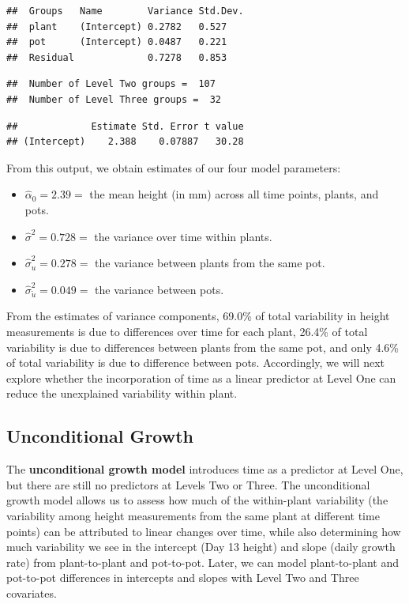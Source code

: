 \documentclass[
]{krantz}
\providecommand{\tightlist}{%
  \setlength{\itemsep}{0pt}\setlength{\parskip}{0pt}}
\begin{document}
\begin{verbatim}
##  Groups   Name        Variance Std.Dev.
##  plant    (Intercept) 0.2782   0.527   
##  pot      (Intercept) 0.0487   0.221   
##  Residual             0.7278   0.853
\end{verbatim}

\begin{verbatim}
##  Number of Level Two groups =  107 
##  Number of Level Three groups =  32
\end{verbatim}

\begin{verbatim}
##             Estimate Std. Error t value
## (Intercept)    2.388    0.07887   30.28
\end{verbatim}

From this output, we obtain estimates of our four model parameters:

\begin{itemize}
\tightlist
\item
  \(\hat{\alpha}_{0}=2.39=\) the mean height (in mm) across all time points, plants, and pots.
\item
  \(\hat{\sigma}^2=0.728=\) the variance over time within plants.
\item
  \(\hat{\sigma}_{u}^{2}=0.278=\) the variance between plants from the same pot.
\item
  \(\hat{\sigma}_{\tilde{u}}^{2}=0.049=\) the variance between pots.
\end{itemize}

From the estimates of variance components, 69.0\% of total variability in height measurements is due to differences over time for each plant, 26.4\% of total variability is due to differences between plants from the same pot, and only 4.6\% of total variability is due to difference between pots. Accordingly, we will next explore whether the incorporation of time as a linear predictor at Level One can reduce the unexplained variability within plant.

\hypertarget{unconditional-growth}{%
\subsection{Unconditional Growth}\label{unconditional-growth}}

The \textbf{unconditional growth model}  introduces time as a predictor at Level One, but there are still no predictors at Levels Two or Three. The unconditional growth model allows us to assess how much of the within-plant variability (the variability among height measurements from the same plant at different time points) can be attributed to linear changes over time, while also determining how much variability we see in the intercept (Day 13 height) and slope (daily growth rate) from plant-to-plant and pot-to-pot. Later, we can model plant-to-plant and pot-to-pot differences in intercepts and slopes with Level Two and Three covariates.
\end{document}
